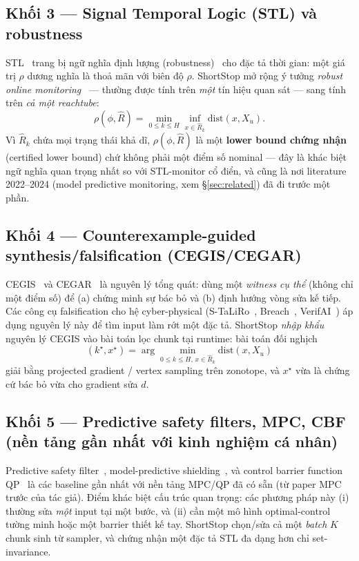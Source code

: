 \documentclass[a4paper,12pt]{article}
\begin{document}
\subsection{Khối 3 --- Signal Temporal Logic (STL) và robustness}
STL~\cite{maler2004monitoring} trang bị ngữ nghĩa định lượng (robustness)~\cite{donze2010robust,fainekos2009robustness} cho đặc tả thời gian: một giá trị $\rho$ dương nghĩa là thoả mãn với biên độ $\rho$. ShortStop mở rộng ý tưởng \emph{robust online monitoring}~\cite{deshmukh2017robust} --- thường được tính trên \emph{một} tín hiệu quan sát --- sang tính trên \emph{cả một reachtube}:
\[
\rho(\phi,\hat R) = \min_{0\le k\le H} \inf_{x\in\hat R_k} \mathrm{dist}(x,X_u).
\]
Vì $\hat R_k$ chứa mọi trạng thái khả dĩ, $\rho(\phi,\hat R)$ là một \textbf{lower bound chứng nhận} (certified lower bound) chứ không phải một điểm số nominal --- đây là khác biệt ngữ nghĩa quan trọng nhất so với STL-monitor cổ điển, và cũng là nơi literature 2022--2024 (model predictive monitoring, xem \S\ref{sec:related}) đã đi trước một phần.

\subsection{Khối 4 --- Counterexample-guided synthesis/falsification (CEGIS/CEGAR)}
CEGIS~\cite{solar2006combinatorial} và CEGAR~\cite{clarke2000counterexample} là nguyên lý tổng quát: dùng một \emph{witness cụ thể} (không chỉ một điểm số) để (a) chứng minh sự bác bỏ và (b) định hướng vòng sửa kế tiếp. Các công cụ falsification cho hệ cyber-physical (S-TaLiRo~\cite{annpureddy2011staliro}, Breach~\cite{donze2010breach}, VerifAI~\cite{dreossi2019verifai}) áp dụng nguyên lý này để tìm input làm rớt một đặc tả. ShortStop \emph{nhập khẩu} nguyên lý CEGIS vào bài toán lọc chunk tại runtime: bài toán đối nghịch
\[
(k^\star, x^\star) = \arg\min_{0\le k\le H,\, x\in\hat R_k} \mathrm{dist}(x,X_u)
\]
giải bằng projected gradient / vertex sampling trên zonotope, và $x^\star$ vừa là chứng cứ bác bỏ vừa cho gradient sửa $d$.

\subsection{Khối 5 --- Predictive safety filters, MPC, CBF (nền tảng gần nhất với kinh nghiệm cá nhân)}
Predictive safety filter~\cite{wabersich2021predictive}, model-predictive shielding~\cite{bastani2021safe}, và control barrier function QP~\cite{ames2017cbf,ames2019cbf-ecc,cheng2019end} là các baseline gần nhất với nền tảng MPC/QP đã có sẵn (từ paper MPC trước của tác giả). Điểm khác biệt cấu trúc quan trọng: các phương pháp này (i) thường sửa \emph{một} input tại một bước, và (ii) cần một mô hình optimal-control tường minh hoặc một barrier thiết kế tay. ShortStop chọn/sửa cả một \emph{batch} $K$ chunk sinh từ sampler, và chứng nhận một đặc tả STL đa dạng hơn chỉ set-invariance.
\end{document}
